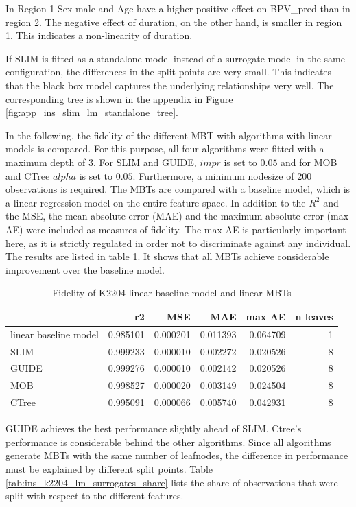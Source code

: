 In Region 1 Sex male and Age have a higher positive effect on  BPV\_pred than in region 2. The negative effect of duration, on the other hand, is smaller in region 1. This indicates a non-linearity of duration.

If SLIM is fitted as a standalone model instead of a surrogate model in the same configuration, the differences in the split points are very small. This indicates that the black box model captures the underlying relationships very well. The corresponding tree is shown in the appendix in Figure \ref{fig:app_ins_slim_lm_standalone_tree}.

In the following, the fidelity of the different MBT with algorithms with linear models is compared. For this purpose, all four algorithms were fitted with a maximum depth of 3. For SLIM and GUIDE, $impr$ is set to $0.05$ and for MOB and CTree $alpha$ is set to $0.05$. Furthermore, a minimum nodesize of 200 observations is required.
The MBTs are compared with a baseline model, which is a linear regression model on the entire feature space. In addition to the $R^2$ and the MSE, the mean absolute error (MAE) and the maximum absolute error (max AE) were included as measures of fidelity. The max AE is particularly important here, as it is strictly regulated in order not to discriminate against any individual. 
The results are listed in table \ref{tab:ins_k2204_lm_surrogates_perf}. It shows that all MBTs achieve considerable improvement over the baseline model.

\begin{table}[!htb]

\caption{Fidelity of K2204 linear baseline model and linear MBTs}
\centering \small
\begin{tabular}[t]{l|r|r|r|r|r}
\hline
  & r2 & MSE & MAE & max AE & n leaves\\
\hline
linear baseline model & 0.985101 & 0.000201 & 0.011393 & 0.064709 & 1\\
\hline
SLIM & 0.999233 & 0.000010 & 0.002272 & 0.020526 & 8\\
GUIDE & 0.999276 & 0.000010 & 0.002142 & 0.020526 & 8\\
MOB & 0.998527 & 0.000020 & 0.003149 & 0.024504 & 8\\
CTree & 0.995091 & 0.000066 & 0.005740 & 0.042931 & 8\\
\hline
\end{tabular}
\label{tab:ins_k2204_lm_surrogates_perf}
\end{table}

GUIDE achieves the best performance slightly ahead of SLIM. Ctree's performance is considerable behind the other algorithms.
Since all algorithms generate MBTs with the same number of leafnodes, the difference in performance must be explained by different split points.
Table \ref{tab:ins_k2204_lm_surrogates_share} lists the share of observations that were split with respect to the different features.

